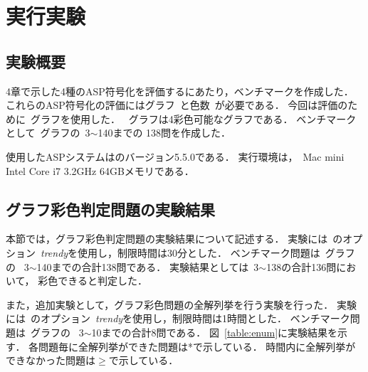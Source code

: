 \chapter{実行実験}

\section{実験概要}

4章で示した4種のASP符号化を評価するにあたり，ベンチマークを作成した．
これらのASP符号化の評価にはグラフ~と色数~が必要である．
今回は評価のために~グラフを使用した．
~グラフは4彩色可能なグラフである．
ベンチマークとして~グラフの~3$\sim$140までの
138問を作成した．

使用したASPシステムは{\clingo}のバージョン5.5.0である．
実行環境は，~Mac mini Intel Core i7 3.2GHz 64GBメモリである．

\section{グラフ彩色判定問題の実験結果}

本節では，グラフ彩色判定問題の実験結果について記述する．
実験には~{\clingo}のオプション~\textit{trendy}を使用し，制限時間は30分とした．
ベンチマーク問題は~グラフの
~3$\sim$140までの合計138問である．
実験結果としては~3$\sim$138の合計136問において，
彩色できると判定した．

また，追加実験として，グラフ彩色問題の全解列挙を行う実験を行った．
実験には~{\clingo}のオプション~\textit{trendy}を使用し，制限時間は1時間とした．
ベンチマーク問題は~グラフの
~3$\sim$10までの合計8問である．
図~\ref{table:enum}に実験結果を示す．
各問題毎に全解列挙ができた問題は*で示している．
時間内に全解列挙ができなかった問題は$\geq$で示している．

\begin{table}[tb]
  \begin{minipage}[t]{0.45\linewidth}
    \centering
  \end{minipage}
  \begin{minipage}[t]{0.45\linewidth}
    \centering
  \end{minipage}
\end{table}

